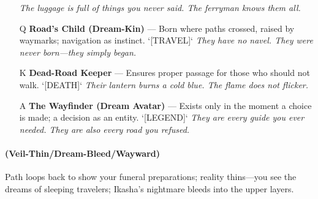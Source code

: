 \begin{enumerate}
  \hfill \textit{The luggage is full of things you never said. The ferryman knows them all.}
\item[Q] \textbf{Road's Child (Dream-Kin)} --- Born where paths crossed, raised by waymarks; navigation as instinct. `[TRAVEL]`
  \hfill \textit{They have no navel. They were never born---they simply began.}
\item[K] \textbf{Dead-Road Keeper} --- Ensures proper passage for those who should not walk. `[DEATH]`
  \hfill \textit{Their lantern burns a cold blue. The flame does not flicker.}
\item[A] \textbf{The Wayfinder (Dream Avatar)} --- Exists only in the moment a choice is made; a decision as an entity. `[LEGEND]`
  \hfill \textit{They are every guide you ever needed. They are also every road you refused.}
\end{enumerate}

\paragraph*{(Veil-Thin/Dream-Bleed/Wayward)} Path loops back to show your funeral preparations; reality thins---you see the dreams of sleeping travelers; Ikasha's nightmare bleeds into the upper layers.

